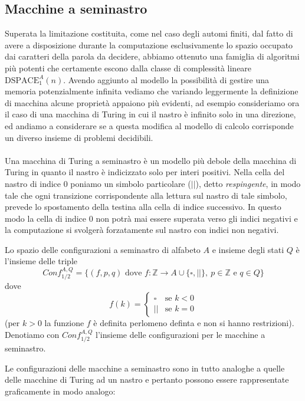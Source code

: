 \subsection{Macchine a seminastro}
Superata la limitazione costituita, come nel caso degli automi finiti, dal fatto di avere a disposizione durante la computazione esclusivamente lo spazio occupato dai caratteri della parola da decidere, abbiamo ottenuto una famiglia di algoritmi più potenti che certamente escono dalla classe di complessità lineare $\mathrm{DSPACE}_1^A(n)$. Avendo aggiunto al modello la possibilità di gestire una memoria potenzialmente infinita vediamo che variando leggermente la definizione di macchina alcune proprietà appaiono più evidenti, ad esempio consideriamo ora il caso di una macchina di Turing in cui il nastro è infinito solo in una direzione, ed andiamo a considerare se a questa modifica al modello di calcolo corrisponde un diverso insieme di problemi decidibili.
\\ \\
Una macchina di Turing a seminastro è un modello più debole della macchina di Turing in quanto il nastro è indicizzato solo per interi positivi. Nella cella del nastro di indice $0$ poniamo un simbolo particolare ($||$), detto \emph{respingente}, in modo tale che ogni transizione corrispondente alla lettura sul nastro di tale simbolo, prevede lo spostamento della testina alla cella di indice successivo. In questo modo la cella di indice $0$ non potrà mai essere superata verso gli indici negativi e la computazione si svolgerà forzatamente sul nastro con indici non negativi.

\begin{defi}
Lo spazio delle configurazioni a seminastro di alfabeto $A$ e insieme degli stati $Q$ è l'insieme delle triple
\[
Conf_{1/2}^{A,Q}=\{(f,p,q) \text{ dove } f:\mathbb{Z}\to A\cup\{\square,||\},\ p\in\mathbb{Z} \text{ e } q\in Q\}
\]
dove
\[
f(k)=\begin{cases}
\square & \text{se } k<0\\
|| & \text{se } k=0
\end{cases}
\]
(per $k>0$ la funzione $f$ è definita perlomeno definta e non si hanno restrizioni).
Denotiamo con $Conf_{1/2}^{A,Q}$ l'insieme delle configurazioni per le macchine a seminastro.
\end{defi}

Le configurazioni delle macchine a seminastro sono in tutto analoghe a quelle delle macchine di Turing ad un nastro e pertanto possono essere rappresentate graficamente in modo analogo:

